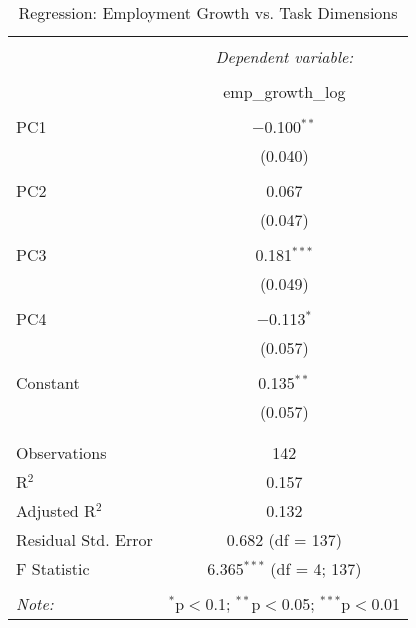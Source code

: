 
\begin{table}[!htbp] \centering 
  \caption{Regression: Employment Growth vs. Task Dimensions} 
  \label{} 
\begin{tabular}{@{\extracolsep{5pt}}lc} 
\\[-1.8ex]\hline 
\hline \\[-1.8ex] 
 & \multicolumn{1}{c}{\textit{Dependent variable:}} \\ 
\cline{2-2} 
\\[-1.8ex] & emp\_growth\_log \\ 
\hline \\[-1.8ex] 
 PC1 & $-$0.100$^{**}$ \\ 
  & (0.040) \\ 
  & \\ 
 PC2 & 0.067 \\ 
  & (0.047) \\ 
  & \\ 
 PC3 & 0.181$^{***}$ \\ 
  & (0.049) \\ 
  & \\ 
 PC4 & $-$0.113$^{*}$ \\ 
  & (0.057) \\ 
  & \\ 
 Constant & 0.135$^{**}$ \\ 
  & (0.057) \\ 
  & \\ 
\hline \\[-1.8ex] 
Observations & 142 \\ 
R$^{2}$ & 0.157 \\ 
Adjusted R$^{2}$ & 0.132 \\ 
Residual Std. Error & 0.682 (df = 137) \\ 
F Statistic & 6.365$^{***}$ (df = 4; 137) \\ 
\hline 
\hline \\[-1.8ex] 
\textit{Note:}  & \multicolumn{1}{r}{$^{*}$p$<$0.1; $^{**}$p$<$0.05; $^{***}$p$<$0.01} \\ 
\end{tabular} 
\end{table} 
